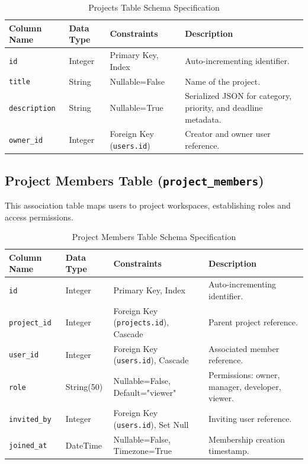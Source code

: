 \begin{table}[h!]
\centering
\small
\renewcommand{\arraystretch}{1.4}
\begin{tabularx}{\textwidth}{l l l X}
    \toprule[1.5pt]
    \rowcolor{primary!5}
    \textbf{\color{primary}Column Name} & \textbf{\color{primary}Data Type} & \textbf{\color{primary}Constraints} & \textbf{\color{primary}Description} \\
    \midrule
    \texttt{id} & Integer & Primary Key, Index & Auto-incrementing identifier. \\
    \texttt{title} & String & Nullable=False & Name of the project. \\
    \texttt{description} & String & Nullable=True & Serialized JSON for category, priority, and deadline metadata. \\
    \texttt{owner\_id} & Integer & Foreign Key (\texttt{users.id}) & Creator and owner user reference. \\
    \bottomrule[1.5pt]
\end{tabularx}
\caption{Projects Table Schema Specification}
\label{tab:projects_table}
\end{table}

\subsection{Project Members Table (\texttt{project\_members})}
This association table maps users to project workspaces, establishing roles and access permissions.

\begin{table}[h!]
\centering
\small
\renewcommand{\arraystretch}{1.4}
\begin{tabularx}{\textwidth}{l l l X}
    \toprule[1.5pt]
    \rowcolor{primary!5}
    \textbf{\color{primary}Column Name} & \textbf{\color{primary}Data Type} & \textbf{\color{primary}Constraints} & \textbf{\color{primary}Description} \\
    \midrule
    \texttt{id} & Integer & Primary Key, Index & Auto-incrementing identifier. \\
    \texttt{project\_id} & Integer & Foreign Key (\texttt{projects.id}), Cascade & Parent project reference. \\
    \texttt{user\_id} & Integer & Foreign Key (\texttt{users.id}), Cascade & Associated member reference. \\
    \texttt{role} & String(50) & Nullable=False, Default="viewer" & Permissions: owner, manager, developer, viewer. \\
    \texttt{invited\_by} & Integer & Foreign Key (\texttt{users.id}), Set Null & Inviting user reference. \\
    \texttt{joined\_at} & DateTime & Nullable=False, Timezone=True & Membership creation timestamp. \\
    \bottomrule[1.5pt]
\end{tabularx}
\caption{Project Members Table Schema Specification}
\label{tab:project_members_table}
\end{table}


